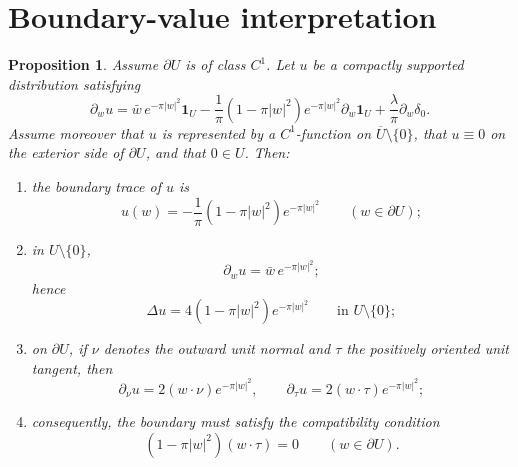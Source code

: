 \documentclass[11pt]{article}
\newtheorem{proposition}[theorem]{Proposition}
\newcommand{\1}{\mathbf 1}
\newcommand{\pw}{\partial_w}
\begin{document}
\section{Boundary-value interpretation}

\begin{proposition}\label{prop:bvp}
Assume \(\partial U\) is of class \(C^1\). Let \(u\) be a compactly supported distribution
satisfying
\[
\pw u
=
\bar w\,e^{-\pi|w|^2}\1_U
-\frac1\pi(1-\pi|w|^2)e^{-\pi|w|^2}\pw \1_U
+\frac{\lambda}{\pi}\pw\delta_0.
\]
Assume moreover that \(u\) is represented by a \(C^1\)-function on \(\overline U\setminus\{0\}\),
that \(u\equiv 0\) on the exterior side of \(\partial U\), and that \(0\in U\). Then:
\begin{enumerate}[label=\textnormal{(\roman*)}]
\item the boundary trace of \(u\) is
\begin{equation}\label{eq:dirichlet-trace}
u(w)
=
-\frac1\pi(1-\pi|w|^2)e^{-\pi|w|^2}
\qquad (w\in \partial U);
\end{equation}
\item in \(U\setminus\{0\}\),
\begin{equation}\label{eq:interior-first-order}
\pw u=\bar w\,e^{-\pi|w|^2};
\end{equation}
hence
\begin{equation}\label{eq:interior-laplacian}
\Delta u=4(1-\pi|w|^2)e^{-\pi|w|^2}
\qquad \text{in }U\setminus\{0\};
\end{equation}
\item on \(\partial U\), if \(\nu\) denotes the outward unit normal and \(\tau\) the positively
oriented unit tangent, then
\begin{equation}\label{eq:normal-tangent-derivatives}
\partial_\nu u
=
2(w\cdot \nu)e^{-\pi|w|^2},
\qquad
\partial_\tau u
=
2(w\cdot \tau)e^{-\pi|w|^2};
\end{equation}
\item consequently, the boundary must satisfy the compatibility condition
\begin{equation}\label{eq:compatibility}
(1-\pi|w|^2)(w\cdot \tau)=0
\qquad (w\in \partial U).
\end{equation}
\end{enumerate}
\end{proposition}
\end{document}

